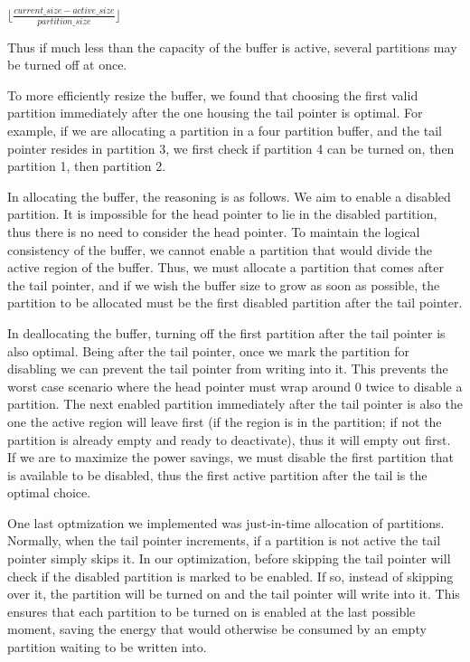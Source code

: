 \documentclass{acm_proc_article-sp}
\begin{document}
\begin{center}
$\lfloor \frac{current\_size - active\_size}{partition\_size} \rfloor$
\end{center}

Thus if much less than the capacity of the buffer is active, several partitions may be turned off at once.

To more efficiently resize the buffer, we found that choosing the first valid partition immediately after the one housing the tail pointer is optimal. For example, if we are allocating a partition in a four partition buffer, and the tail pointer resides in partition 3, we first check if partition 4 can be turned on, then partition 1, then partition 2.

In allocating the buffer, the reasoning is as follows. We aim to enable a disabled partition. It is impossible for the head pointer to lie in the disabled partition, thus there is no need to consider the head pointer. To maintain the logical consistency of the buffer, we cannot enable a partition that would divide the active region of the buffer. Thus, we must allocate a partition that comes after the tail pointer, and if we wish the buffer size to grow as soon as possible, the partition to be allocated must be the first disabled partition after the tail pointer.

In deallocating the buffer, turning off the first partition after the tail pointer is also optimal. Being after the tail pointer, once we mark the partition for disabling we can prevent the tail pointer from writing into it. This prevents the worst case scenario where the head pointer must wrap around 0 twice to disable a partition. The next enabled partition immediately after the tail pointer is also the one the active region will leave first (if the region is in the partition; if not the partition is already empty and ready to deactivate), thus it will empty out first. If we are to maximize the power savings, we must disable the first partition that is available to be disabled, thus the first active partition after the tail is the optimal choice.

One last optmization we implemented was just-in-time allocation of partitions. Normally, when the tail pointer increments, if a partition is not active the tail pointer simply skips it. In our optimization, before skipping the tail pointer will check if the disabled partition is marked to be enabled. If so, instead of skipping over it, the partition will be turned on and the tail pointer will write into it. This ensures that each partition to be turned on is enabled at the last possible moment, saving the energy that would otherwise be consumed by an empty partition waiting to be written into.
\end{document}

